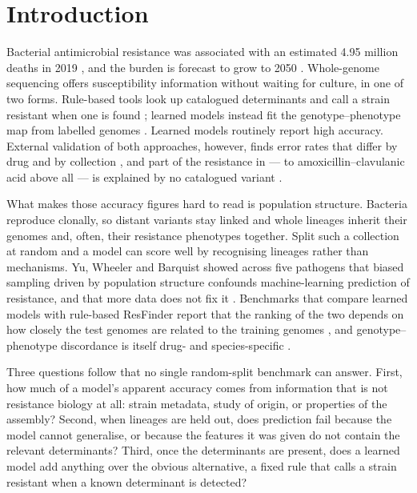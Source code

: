 \section*{Introduction}

Bacterial antimicrobial resistance was associated with an estimated 4.95 million deaths in 2019
\cite{murray2022gram}, and the burden is forecast to grow to 2050 \cite{naghavi2024forecast}.
Whole-genome sequencing offers susceptibility information without waiting for culture, in one of
two forms. Rule-based tools look up catalogued determinants and call a strain resistant when one is
found \cite{bortolaia2020resfinder,feldgarden2019amrfinder,feldgarden2021amrfinderplus}; learned
models instead fit the genotype--phenotype map from labelled genomes
\cite{moradigaravand2018prediction,her2018pangenome,ren2022giessen,orcales2024tutorial}. Learned
models routinely report high accuracy. External validation of both approaches, however, finds error
rates that differ by drug and by collection \cite{verschuuren2022external}, and part of the
resistance in \Ecoli{} --- to amoxicillin--clavulanic acid above all --- is explained by no
catalogued variant \cite{lipworth2024uncatalogued}.

What makes those accuracy figures hard to read is population structure. Bacteria reproduce
clonally, so distant variants stay linked and whole lineages inherit their genomes and, often,
their resistance phenotypes together. Split such a collection at random and a model can score well
by recognising lineages rather than mechanisms. Yu, Wheeler and Barquist showed across five
pathogens that biased sampling driven by population structure confounds machine-learning
prediction of resistance, and that more data does not fix it \cite{yu2025biased}. Benchmarks that
compare learned models with rule-based ResFinder report that the ranking of the two depends on how
closely the test genomes are related to the training genomes \cite{hu2024assessing}, and
genotype--phenotype discordance is itself drug- and species-specific \cite{cheon2026discordance}.

Three questions follow that no single random-split benchmark can answer. First, how much of a
model's apparent accuracy comes from information that is not resistance biology at all: strain
metadata, study of origin, or properties of the assembly? Second, when lineages are held out, does
prediction fail because the model cannot generalise, or because the features it was given do not
contain the relevant determinants? Third, once the determinants are present, does a learned model
add anything over the obvious alternative, a fixed rule that calls a strain resistant when a known
determinant is detected?

